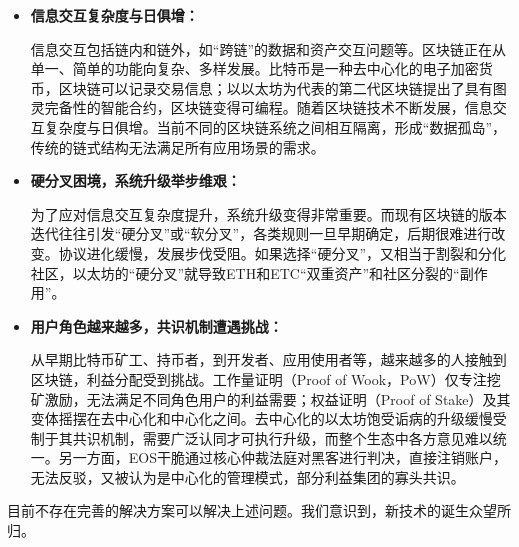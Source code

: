 \begin{itemize}
\item \textbf{信息交互复杂度与日俱增：}

信息交互包括链内和链外，如“跨链”的数据和资产交互问题等。区块链正在从单⼀、简单的功能向复杂、多样发展。比特币是一种去中心化的电子加密货币，区块链可以记录交易信息；以以太坊为代表的第二代区块链提出了具有图灵完备性的智能合约，区块链变得可编程。随着区块链技术不断发展，信息交互复杂度与日俱增。当前不同的区块链系统之间相互隔离，形成“数据孤岛”，传统的链式结构无法满足所有应用场景的需求。

\item \textbf{硬分叉困境，系统升级举步维艰：}

为了应对信息交互复杂度提升，系统升级变得非常重要。而现有区块链的版本迭代往往引发“硬分叉”或“软分叉”，各类规则一旦早期确定，后期很难进行改变。协议进化缓慢，发展步伐受阻。如果选择“硬分叉”，又相当于割裂和分化社区，以太坊的“硬分叉”就导致ETH和ETC“双重资产”和社区分裂的“副作用”。

\item \textbf{用户角色越来越多，共识机制遭遇挑战：}

从早期比特币矿工、持币者，到开发者、应用使用者等，越来越多的人接触到区块链，利益分配受到挑战。工作量证明（Proof of Wook，PoW）仅专注挖矿激励，无法满足不同角色用户的利益需要；权益证明（Proof of Stake）及其变体摇摆在去中心化和中心化之间。去中心化的以太坊饱受诟病的升级缓慢受制于其共识机制，需要广泛认同才可执行升级，而整个生态中各方意见难以统一。另一方面，EOS干脆通过核心仲裁法庭对黑客进行判决，直接注销账户，无法反驳，又被认为是中心化的管理模式，部分利益集团的寡头共识。
\end{itemize}

目前不存在完善的解决方案可以解决上述问题。我们意识到，新技术的诞生众望所归。
